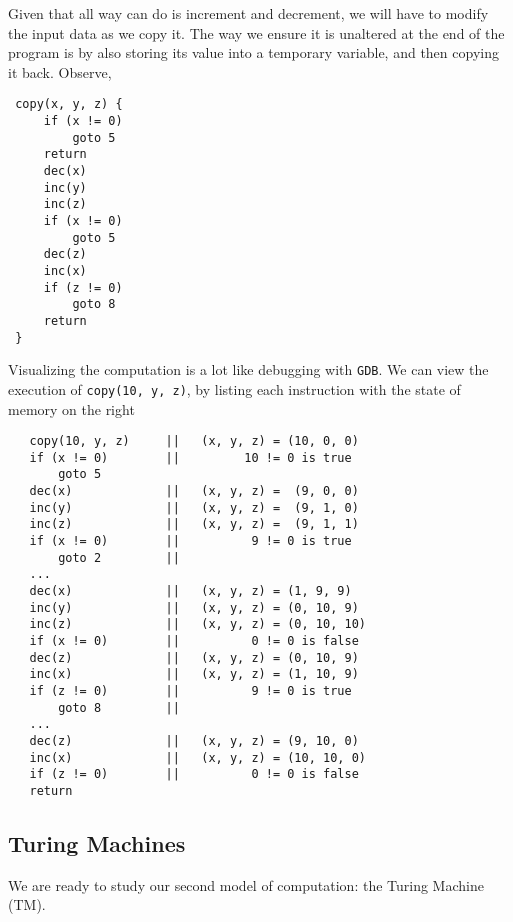 \documentclass[english, 12pt]{article}
\begin{document}
  
  Given that all way can do is increment and 
  decrement, we will have to modify the input data as we copy it. The way we ensure it is unaltered
  at the end of the program is by also storing its value into a temporary variable, and then
  copying it back. Observe,
  \begin{lstlisting}
 copy(x, y, z) {
     if (x != 0)
         goto 5
     return
     dec(x)
     inc(y)
     inc(z)
     if (x != 0)
         goto 5
     dec(z)
     inc(x)
     if (z != 0)
         goto 8
     return
 }
  \end{lstlisting}
  Visualizing the computation is a lot like debugging with \texttt{GDB}. We can view the execution of
  \texttt{copy(10, y, z)}, by listing each instruction with the state of memory on the right
   \begin{lstlisting}
   copy(10, y, z)     ||   (x, y, z) = (10, 0, 0)
   if (x != 0)        ||         10 != 0 is true
       goto 5
   dec(x)             ||   (x, y, z) =  (9, 0, 0)
   inc(y)             ||   (x, y, z) =  (9, 1, 0)
   inc(z)             ||   (x, y, z) =  (9, 1, 1)
   if (x != 0)        ||          9 != 0 is true 
       goto 2         ||
   ...
   dec(x)             ||   (x, y, z) = (1, 9, 9)
   inc(y)             ||   (x, y, z) = (0, 10, 9)
   inc(z)             ||   (x, y, z) = (0, 10, 10)
   if (x != 0)        ||          0 != 0 is false
   dec(z)             ||   (x, y, z) = (0, 10, 9)
   inc(x)             ||   (x, y, z) = (1, 10, 9)
   if (z != 0)        ||          9 != 0 is true
       goto 8         ||
   ...
   dec(z)             ||   (x, y, z) = (9, 10, 0)
   inc(x)             ||   (x, y, z) = (10, 10, 0)
   if (z != 0)        ||          0 != 0 is false
   return
   \end{lstlisting}
      
  \subsection{Turing Machines} 
  We are ready to study our second model of computation: the Turing Machine (TM). \n
   
\end{document}
